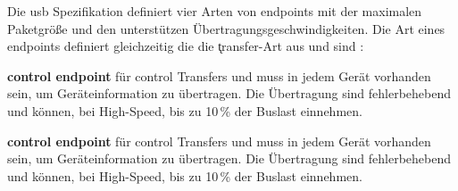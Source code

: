 Die \acrshort{usb} Spezifikation definiert vier Arten von endpoints mit der maximalen Paketgrö{\ss}e und den unterstützen Übertragungsgeschwindigkeiten. Die Art eines endpoints definiert gleichzeitig die die \k{transfer}-Art aus  und sind \cite[Kapitel~8]{usb_developer_guide}:
\begin{compactitem}
    \item \textbf{control endpoint} für control Transfers und muss in jedem Gerät vorhanden sein, um Geräteinformation zu übertragen. Die Übertragung sind fehlerbehebend und können, bei High-Speed, bis zu 10\,\% der Buslast einnehmen.
    \item \textbf{control endpoint} für control Transfers und muss in jedem Gerät vorhanden sein, um Geräteinformation zu übertragen. Die Übertragung sind fehlerbehebend und können, bei High-Speed, bis zu 10\,\% der Buslast einnehmen.
\end{compactitem}

